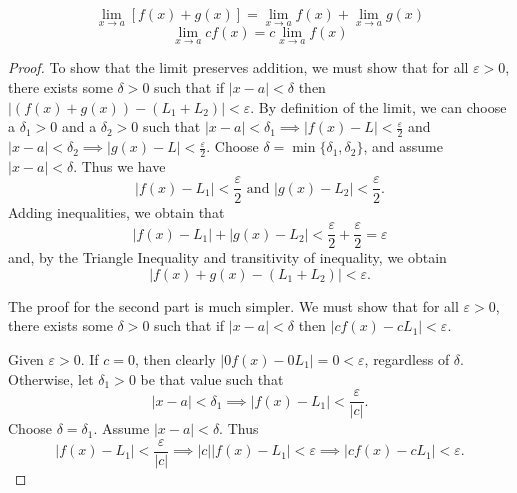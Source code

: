 \documentclass{article}
\begin{document}
\begin{theorem}
$$\lim_{x \to a} [f(x) + g(x)] = \lim_{x \to a} f(x) + \lim_{x \to a} g(x)$$ 
$$\lim_{x \to a} c f(x) = c \lim_{x \to a} f(x)$$
\end{theorem}
\begin{proof}
To show that the limit preserves addition, we must show that for all $\varepsilon > 0$, there exists some $\delta > 0$ such that if $|x - a| < \delta$ then $|(f(x) + g(x)) - (L_1 + L_2)| < \varepsilon$.
By definition of the limit, we can choose a $\delta_1 > 0$ and a $\delta_2 > 0$ such that $|x - a| < \delta_1 \implies |f(x) - L| < \frac{\varepsilon}{2}$ and $|x - a| < \delta_2 \implies |g(x) - L| < \frac{\varepsilon}{2}$. Choose $\delta = \min{\{\delta_1, \delta_2\}}$, and assume $|x - a| < \delta$. Thus we have
\[
|f(x) - L_1| < \frac{\varepsilon}{2} \text{ and } |g(x) - L_2| < \frac{\varepsilon}{2}.
\]
Adding inequalities, we obtain that 
\[
|f(x) - L_1| + |g(x) - L_2| < \frac{\varepsilon}{2} + \frac{\varepsilon}{2} = \varepsilon
\]
and, by the Triangle Inequality and transitivity of inequality, we obtain
\[
|f(x) + g(x) - (L_1 + L_2)| < \varepsilon
.\]


The proof for the second part is much simpler. We must show that for all $\varepsilon > 0$, there exists some $\delta > 0$ such that if $|x - a| < \delta$ then $|cf(x) - cL_1| < \varepsilon$.


Given $\varepsilon > 0$. If $c = 0$, then clearly $|0f(x) - 0L_1| = 0 < \varepsilon$, regardless of $\delta$. Otherwise, let $\delta_1 > 0$ be that value such that 
$$|x - a| < \delta_1 \implies |f(x) - L_1| < \frac{\varepsilon}{|c|}.$$ 
Choose $\delta = \delta_1$. Assume $|x - a| < \delta $. Thus $$|f(x) - L_1| < \frac{\varepsilon}{|c|} \implies |c||f(x) - L_1| < \varepsilon \implies |cf(x) - cL_1| < \varepsilon.$$
\end{proof}
\end{document}
